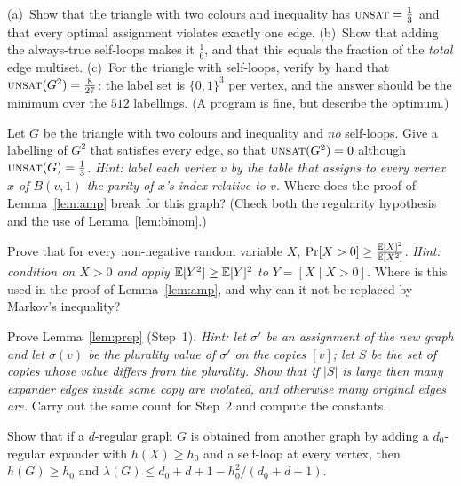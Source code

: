 \begin{exercise}[\stars{$\star$}]\label{ex:two-small-exact}
(a)~Show that the triangle with two colours and inequality has $\textsc{unsat}=\frac13$ and that every optimal assignment violates exactly one edge.
(b)~Show that adding the always-true self-loops makes it $\frac16$, and that this equals the fraction of the \emph{total} edge multiset.
(c)~For the triangle with self-loops, verify by hand that $\textsc{unsat}(G^2)=\frac{8}{27}$: the label set is $\{0,1\}^{3}$ per vertex, and the answer should be the minimum over the $512$ labellings.  (A program is fine, but describe the optimum.)
\end{exercise}

\begin{exercise}[\stars{$\star\star$}]\label{ex:parity}
Let $G$ be the triangle with two colours and inequality and \emph{no} self-loops.  Give a labelling of $G^2$ that satisfies every edge, so that $\textsc{unsat}(G^2)=0$ although $\textsc{unsat}(G)=\frac13$.
\emph{Hint: label each vertex $v$ by the table that assigns to every vertex $x$ of $B(v,1)$ the parity of $x$'s index relative to $v$.}  Where does the proof of Lemma~\ref{lem:amp} break for this graph?  (Check both the regularity hypothesis and the use of Lemma~\ref{lem:binom}.)
\end{exercise}

\begin{exercise}[\stars{$\star\star$}]\label{ex:fact25}
Prove that for every non-negative random variable $X$, $\Pr[X>0]\ge\frac{\operatorname*{\mathbb{E}}[X]^2}{\operatorname*{\mathbb{E}}[X^2]}$.  \emph{Hint: condition on $X>0$ and apply $\operatorname*{\mathbb{E}}[Y^2]\ge\operatorname*{\mathbb{E}}[Y]^2$ to $Y=[X\mid X>0]$.}
Where is this used in the proof of Lemma~\ref{lem:amp}, and why can it not be replaced by Markov's inequality?
\end{exercise}

\begin{exercise}[\stars{$\star\star$}]\label{ex:prep-degree}
Prove Lemma~\ref{lem:prep} (Step~1).  \emph{Hint: let $\sigma'$ be an assignment of the new graph and let $\sigma(v)$ be the plurality value of $\sigma'$ on the copies $[v]$; let $S$ be the set of copies whose value differs from the plurality.  Show that if $|S|$ is large then many expander edges inside some copy are violated, and otherwise many original edges are.}
Carry out the same count for Step~2 and compute the constants.
\end{exercise}

\begin{exercise}[\stars{$\star$}]\label{ex:prep-expand}
Show that if a $d$-regular graph $G$ is obtained from another graph by adding a $d_0$-regular expander with $h(X)\ge h_0$ and a self-loop at every vertex, then $h(G)\ge h_0$ and $\lambda(G)\le d_0+d+1-h_0^2/(d_0+d+1)$.
\end{exercise}

